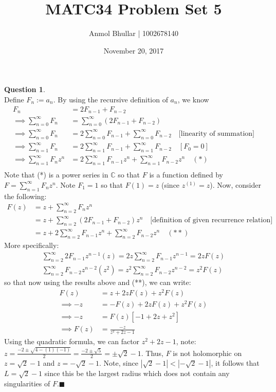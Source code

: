 \documentclass{article}
\title{MATC34 Problem Set 5}
\date{November 20, 2017}
\author{Anmol Bhullar | 1002678140}
\begin{document}
    \maketitle 

    \textbf{Question 1}.\\
    Define $F_n := a_n$. By using the recursive definition of $a_n$, we know 
    \begin{align*} 
        F_n &= 2F_{n-1} + F_{n-2} \\
        \implies \sum_{n=0}^{\infty} F_n &= \sum_{n=0}^{\infty} (2F_{n-1} + F_{n-2}) \\
        \implies \sum_{n=0}^{\infty} F_n &= 2\sum_{n=0}^{\infty} F_{n-1} + \sum_{n=0}^{\infty} 
            F_{n-2}\quad\text{[linearity of summation]}\\
        \implies \sum_{n=1}^{\infty} F_n &= 2\sum_{n=1}^{\infty} F_{n-1} + \sum_{n=1}^{\infty} F_{n-2}\quad[F_0 = 0]\\
        \implies \sum_{n=1}^{\infty} F_nz^n &= 2\sum_{n=1}^{\infty} F_{n-1}z^n + \sum_{n=1}^{\infty} F_{n-2}z^n\quad(*)\\
    \end{align*}
    Note that (*) is a power series in $\mathbb{C}$ so that $F$ is a function defined by $F = \sum_{n=1}^{\infty} F_nz^n$.
    Note $F_1 = 1$ so that $F(1) = z$ (since $z^{(1)} = z$). Now, consider the following:
    \begin{align*}
        F(z) &= z + \sum_{n=2}^{\infty} F_nz^n \\
        &= z + \sum_{n=2}^{\infty} (2F_{n-1}+F_{n-2})z^n\quad\text{[definition of given recurrence relation]}\\
        &= z + 2\sum_{n=2}^{\infty} F_{n-1}z^n + \sum_{n=2}^{\infty} F_{n-2}z^n\quad(**)
    \end{align*}
    More specifically:
    \begin{align*}
        \sum_{n=2}^{\infty} 2F_{n-1}z^{n-1}(z) = 2z\sum_{n=2}^{\infty} F_{n-1}z^{n-1} = 2zF(z) \\
        \sum_{n=2}^{\infty} F_{n-2}z^{n-2}(z^2) = z^2\sum_{n=2}^{\infty} F_{n-2}z^{n-2} = z^2F(z)
    \end{align*}
    so that now using the results above and (**), we can write:
    \begin{align*}
        F(z) &= z + 2zF(z) + z^2F(z) \\
        \implies -z &= -F(z) + 2zF(z) + z^2F(z)\\
        \implies -z &= F(z)[-1 + 2z + z^2]\\
        \implies F(z) &= \frac{-z}{z^2+2z-1}
    \end{align*}
    Using the quadratic formula, we can factor $z^2+2z-1$, note: $z = \frac{-2 \pm \sqrt{4-(1)(-1)}}{2} = \frac{-2 \pm \sqrt{5}}{2} =
    \pm\sqrt{2} - 1$. Thus, $F$ is not holomorphic on $z = \sqrt{2}-1$ and $z = -\sqrt{2}-1$. Note, since $|\sqrt{2}-1| < |-\sqrt{2}-1|$,
    it follows that $L = \sqrt{2} - 1$ since this be the largest radius which does not contain any singularities 
    of $F$.\hfill$\blacksquare$\\
\end{document}
